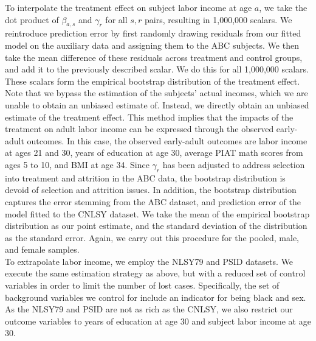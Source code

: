 \noindent To interpolate the treatment effect on subject labor income at age $a$, we take the dot product
of $\beta_{a, s}$ and $\gamma_r$ for all $s,r$ pairs, resulting in 1,000,000 scalars. We reintroduce
prediction error by first randomly drawing residuals from our fitted model on the auxiliary data and assigning
them to the ABC subjects. We then take the mean difference of these residuals across treatment and control
groups, and add it to the previously described scalar. We do this for all 1,000,000 scalars. These scalars form the empirical
bootstrap distribution of the treatment effect. Note that
we bypass the estimation of the subjects' actual incomes, which we are unable to obtain an
unbiased estimate of. Instead, we directly obtain an unbiased estimate of the treatment effect. This
method implies that the impacts of the treatment on adult labor income can be expressed through
the observed early-adult outcomes. In this case, the observed early-adult outcomes are labor income at ages 21 and
30, years of education at age 30, average PIAT math scores from ages 5 to 10, and BMI at age 34. Since $\gamma_r$ has
been adjusted to address selection into treatment and attrition in the ABC data, the bootstrap distribution
is devoid of selection and attrition issues. In addition, the bootstrap distribution captures
the error stemming from the ABC dataset, and prediction error of the model fitted to the CNLSY dataset.
We take the mean of the empirical bootstrap distribution as our point estimate, and the standard deviation
of the distribution as the standard error. Again, we carry out this procedure for the
pooled, male, and female samples. \\

\noindent To extrapolate labor income, we employ the NLSY79 and PSID datasets. We execute the same estimation
strategy as above, but with a reduced set of control variables in order to limit the number
of lost cases. Specifically, the set of background variables we control for include an indicator for
being black and sex. As the NLSY79 and PSID are not as rich as the CNLSY, we also
restrict our outcome variables to years of education at age 30 and subject labor income at age 30. \\

